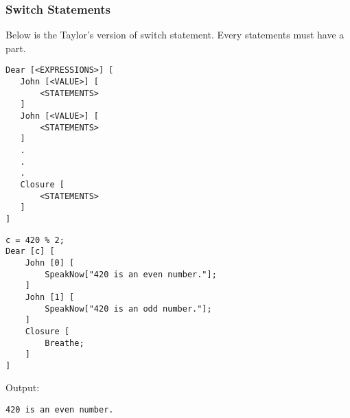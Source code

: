 \subsubsection{Switch Statements}

Below is the Taylor's version of switch statement. Every  statements must have a  part.
\begin{verbatim}
Dear [<EXPRESSIONS>] [
   John [<VALUE>] [
       <STATEMENTS>
   ]
   John [<VALUE>] [
       <STATEMENTS>
   ]
   .
   .
   .
   Closure [
       <STATEMENTS>
   ]
]
\end{verbatim}
\begin{verbatim}
c = 420 % 2;
Dear [c] [
    John [0] [
        SpeakNow["420 is an even number."];
    ]
    John [1] [
        SpeakNow["420 is an odd number."];
    ]
    Closure [
        Breathe;
    ]
]
\end{verbatim}
Output:
\begin{verbatim}
420 is an even number.
\end{verbatim}
